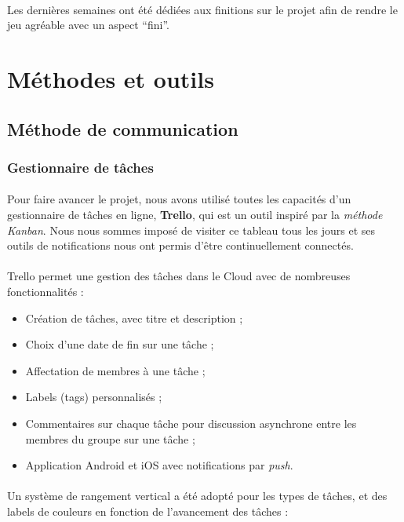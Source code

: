 \paragraph{}
Les dernières semaines ont été dédiées aux finitions sur le projet afin de rendre le jeu agréable avec un aspect “fini”.

\section{Méthodes et outils}

\subsection{Méthode de communication}

\subsubsection{Gestionnaire de tâches}
 
\paragraph{}
Pour faire avancer le projet, nous avons utilisé toutes les capacités d’un gestionnaire de tâches en ligne, \textbf{Trello}, qui est un outil inspiré par la \textit{méthode Kanban}. Nous nous sommes imposé de visiter ce tableau tous les jours et ses outils de notifications nous ont permis d’être continuellement connectés.
 
\paragraph{}
Trello permet une gestion des tâches dans le Cloud avec de nombreuses fonctionnalités :
\begin{itemize}
\item Création de tâches, avec titre et description ;
\item Choix d’une date de fin sur une tâche ;
\item Affectation de membres à une tâche ;
\item Labels (tags) personnalisés ;
\item Commentaires sur chaque tâche pour discussion asynchrone entre les membres du groupe sur une tâche ;
\item Application Android et iOS avec notifications par \textit{push}.
\end{itemize}
 
\paragraph{}
Un système de rangement vertical a été adopté pour les types de tâches, et des labels de couleurs en fonction de l’avancement des tâches :
 
